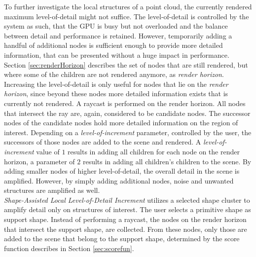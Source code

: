 To further investigate the local structures of a point cloud, the currently rendered maximum level-of-detail might not suffice. The level-of-detail is controlled by the system as such, that the GPU is busy but not overloaded and the balance between detail and performance is retained. However, temporarily adding a handful of additional nodes is sufficient enough to provide more detailed information, that can be presented without a huge impact in performance.
\\

Section \ref{sec:renderHorizon} describes the set of nodes that are still rendered, but where some of the children are not rendered anymore, as \textit{render horizon}. 
Increasing the level-of-detail is only useful for nodes that lie on the \textit{render horizon}, since beyond these nodes more detailed information exists that is currently not rendered. A raycast is performed on the render horizon. All nodes that intersect the ray are, again, considered to be candidate nodes. The successor nodes of the candidate nodes hold more detailed information on the region of interest. Depending on a \textit{level-of-increment} parameter, controlled by the user, the successors of those nodes are added to the scene and rendered. A \textit{level-of-increment} value of $1$ results in adding all children for each node on the render horizon, a parameter of $2$ results in adding all children's children to the scene. 
By adding smaller nodes of higher level-of-detail, the overall detail in the scene is amplified. However, by simply adding additional nodes, noise and unwanted structures are amplified as well. 
\\

\textit{Shape-Assisted Local Level-of-Detail Increment} utilizes a selected shape cluster to amplify detail only on structures of interest. The user selects a primitive shape as support shape. Instead of performing a raycast, the nodes on the render horizon that intersect the support shape, are collected. From these nodes, only those are added to the scene that belong to the support shape, determined by the score function describes in Section \ref{sec:scorefun}. 





